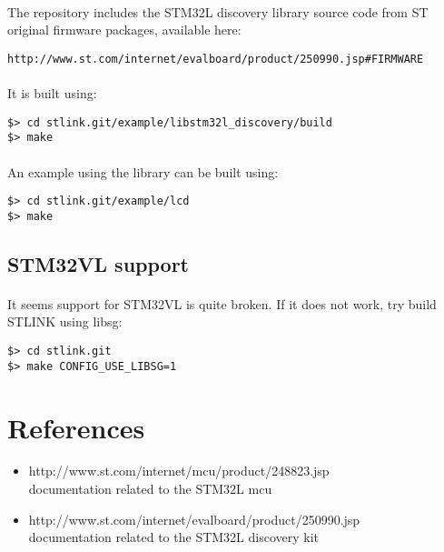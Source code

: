 \documentclass[a4paper, 11pt]{article}
\begin{document}
\paragraph{}
The repository includes the STM32L discovery library source code from ST original firmware packages,
available here:\\
\begin{small}
\begin{lstlisting}[frame=tb]
http://www.st.com/internet/evalboard/product/250990.jsp#FIRMWARE
\end{lstlisting}
\end{small}

\paragraph{}
It is built using:\\
\begin{small}
\begin{lstlisting}[frame=tb]
$> cd stlink.git/example/libstm32l_discovery/build
$> make
\end{lstlisting}
\end{small}

\paragraph{}
An example using the library can be built using:\\
\begin{small}
\begin{lstlisting}[frame=tb]
$> cd stlink.git/example/lcd
$> make
\end{lstlisting}
\end{small}

\subsection{STM32VL support}
\paragraph{}
It seems support for STM32VL is quite broken. If it does not work, try build STLINK using libsg:
\begin{small}
\begin{lstlisting}[frame=tb]
$> cd stlink.git
$> make CONFIG_USE_LIBSG=1
\end{lstlisting}
\end{small}


\newpage
\section{References}
\begin{itemize}
\item http://www.st.com/internet/mcu/product/248823.jsp\\
  documentation related to the STM32L mcu
\item http://www.st.com/internet/evalboard/product/250990.jsp\\
  documentation related to the STM32L discovery kit
\end{itemize}
\end{document}
